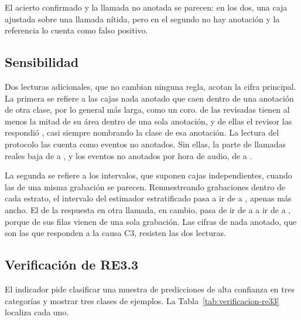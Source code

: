 El acierto confirmado y la llamada no anotada se parecen: en los dos, una caja
ajustada sobre una llamada nítida, pero en el segundo no hay anotación y la
referencia lo cuenta como falso positivo.

\subsection{Sensibilidad}

Dos lecturas adicionales, que no cambian ninguna regla, acotan la cifra principal.
La primera se refiere a las cajas nada anotado que caen dentro de una anotación de
otra clase, por lo general más larga, como un coro. \uNoneInside{} de las revisadas
tienen al menos la mitad de su área dentro de una sola anotación, y
\uNoneInsideOther{} de ellas el revisor las respondió , casi siempre
nombrando la clase de esa anotación. La lectura del protocolo las cuenta como
eventos no anotados. Sin ellas, la parte de llamadas reales baja de \uNoneReal{} a
\uNoneRealKept{}, y los eventos no anotados por hora de audio, de
\uUnannotatedPerHour{} a \uUnannotatedKeptPerHour{}.

La segunda se refiere a los intervalos, que suponen cajas independientes, cuando
las de una misma grabación se parecen. Remuestreando grabaciones dentro de cada
estrato, el intervalo del estimador estratificado pasa a ir de
\uNoneRealBootLow{} a \uNoneRealBootHigh{}, apenas más ancho. El de la respuesta
 en otra llamada, en cambio, pasa de ir de \uLabelOtherLow{} a
\uLabelOtherHigh{} a ir de \uLabelOtherBootLow{} a \uLabelOtherBootHigh{}, porque
\uLabelLargestRecording{} de sus \uLabelRows{} filas vienen de una sola grabación.
Las cifras de nada anotado, que son las que responden a la causa C3, resisten las
dos lecturas.

\subsection{Verificación de RE3.3}
\label{sec:verificacion-re33}

El indicador pide clasificar una muestra de predicciones de alta confianza en tres
categorías y mostrar tres clases de ejemplos. La Tabla~\ref{tab:verificacion-re33}
localiza cada uno.

